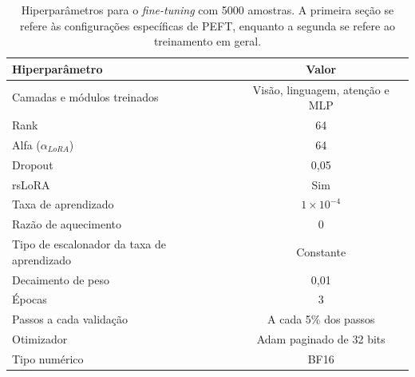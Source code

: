 \clearpage

\begin{table}[ht]
    \caption{\small Hiperparâmetros para o \textit{fine-tuning} com 5000 amostras. A primeira seção se refere às configurações específicas de \ac{PEFT}, enquanto a
    segunda se refere ao treinamento em geral.}
    \centering
    \begin{tabular}{l|c}
        \hline
        Hiperparâmetro                             & Valor                                  \\ \hline
        Camadas e módulos treinados                & Visão, linguagem, atenção e \ac{MLP}   \\
        Rank                                       & 64                                     \\
        Alfa (\begin{math}\alpha_{LoRA}\end{math}) & 64                                     \\
        Dropout                                    & 0,05                                   \\
        \ac{rsLoRA}                                & Sim                                    \\ \hline
        Taxa de aprendizado                        & \begin{math}1 \times 10^{-4}\end{math} \\
        Razão de aquecimento                       & 0                                      \\
        Tipo de escalonador da taxa de aprendizado & Constante                              \\
        Decaimento de peso                         & 0,01                                   \\
        Épocas                                     & 3                                      \\
        Passos a cada validação                    & A cada 5\% dos passos                  \\
        Otimizador                                 & \ac{Adam} paginado de 32 bits          \\
        Tipo numérico                              & \ac{BF16}                              \\ \hline
    \end{tabular}
    \label{tab:qlora_5000_config}
\end{table}

